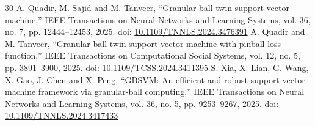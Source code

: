 \documentclass[conference,a4paper]{IEEEtran}
\begin{document}
\begin{thebibliography}{30}
 A. Quadir, M. Sajid and M. Tanveer, ``Granular ball twin support vector machine,'' IEEE Transactions on Neural Networks and Learning Systems, vol. 36, no. 7, pp. 12444--12453, 2025. doi: \href{https://doi.org/10.1109/TNNLS.2024.3476391}{10.1109/TNNLS.2024.3476391}
 A. Quadir and M. Tanveer, ``Granular ball twin support vector machine with pinball loss function,'' IEEE Transactions on Computational Social Systems, vol. 12, no. 5, pp. 3891--3900, 2025. doi: \href{https://doi.org/10.1109/TCSS.2024.3411395}{10.1109/TCSS.2024.3411395}
 S. Xia, X. Lian, G. Wang, X. Gao, J. Chen and X. Peng, ``GBSVM: An efficient and robust support vector machine framework via granular-ball computing,'' IEEE Transactions on Neural Networks and Learning Systems, vol. 36, no. 5, pp. 9253--9267, 2025. doi: \href{https://doi.org/10.1109/TNNLS.2024.3417433}{10.1109/TNNLS.2024.3417433}
\end{thebibliography}
\end{document}
